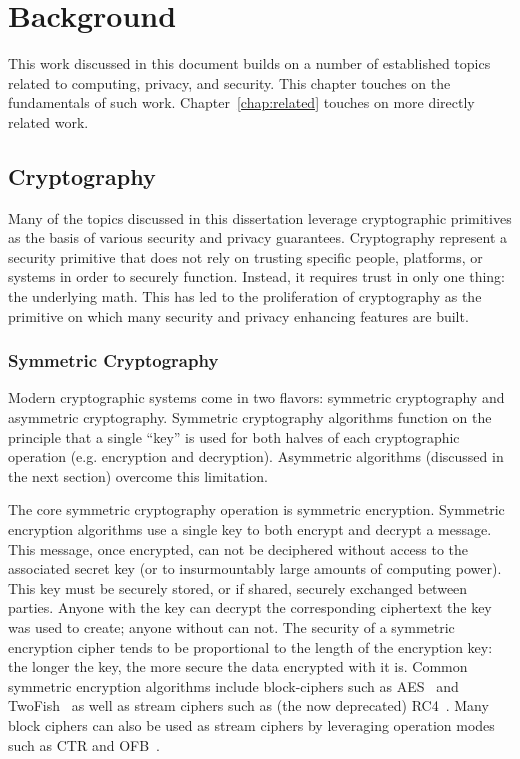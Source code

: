 \chapter{Background}
\label{chap:background}

This work discussed in this document builds on a number of established
topics related to computing, privacy, and security. This chapter
touches on the fundamentals of such work. Chapter~\ref{chap:related}
touches on more directly related work.

\section{Cryptography}
\label{chap:background:crypto}

Many of the topics discussed in this dissertation leverage
cryptographic primitives as the basis of various security and privacy
guarantees. Cryptography represent a security primitive that does not
rely on trusting specific people, platforms, or systems in order to
securely function. Instead, it requires trust in only one thing: the
underlying math. This has led to the proliferation of cryptography as
the primitive on which many security and privacy enhancing features
are built.

\subsection{Symmetric Cryptography}

Modern cryptographic systems come in two flavors: symmetric
cryptography and asymmetric cryptography. Symmetric cryptography
algorithms function on the principle that a single ``key'' is used for
both halves of each cryptographic operation (e.g. encryption and
decryption). Asymmetric algorithms (discussed in the next section)
overcome this limitation.

The core symmetric cryptography operation is symmetric
encryption. Symmetric encryption algorithms use a single key to both
encrypt and decrypt a message. This message, once encrypted, can not
be deciphered without access to the associated secret key (or to
insurmountably large amounts of computing power). This key must be
securely stored, or if shared, securely exchanged between
parties. Anyone with the key can decrypt the corresponding ciphertext
the key was used to create; anyone without can not. The security of a
symmetric encryption cipher tends to be proportional to the length of
the encryption key: the longer the key, the more secure the data
encrypted with it is. Common symmetric encryption algorithms include
block-ciphers such as AES~\cite{nist2001} and
TwoFish~\cite{schneier1998} as well as stream ciphers such as (the now
deprecated) RC4~\cite{rc4-source}. Many block ciphers can also be used
as stream ciphers by leveraging operation modes such as CTR and
OFB~\cite{schneier2010crypto}.

